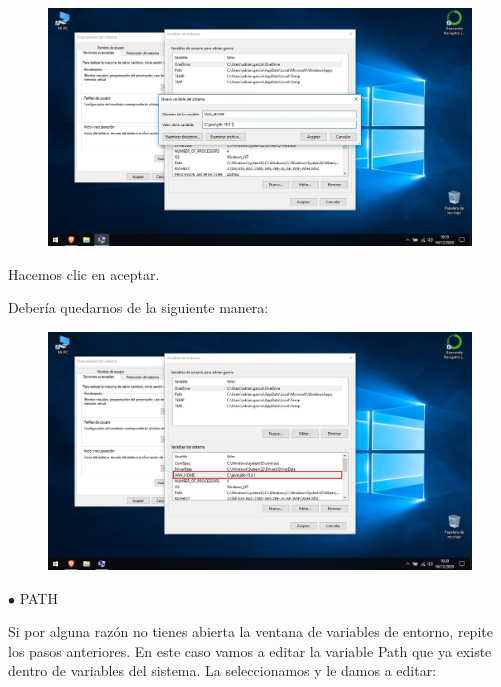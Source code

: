 \documentclass[a4paper,10pt]{article}
\begin{document}
\begin{figure}[H]
\begin{center}
\includegraphics[width=450pt]{./fotos/introduccion/10 - Java.jpg}
\end{center}
\end{figure}

Hacemos clic en aceptar.

\clearpage

Debería quedarnos de la siguiente manera:

\begin{figure}[H]
\begin{center}
\includegraphics[width=500pt]{./fotos/introduccion/11 - Java (V).jpg}
\end{center}
\end{figure}

$\bullet$ PATH 

Si por alguna razón no tienes abierta la ventana de variables de entorno, repite los pasos anteriores. En este caso vamos a editar la variable Path que ya existe dentro de variables del sistema. La seleccionamos y le damos a editar:
\end{document}
